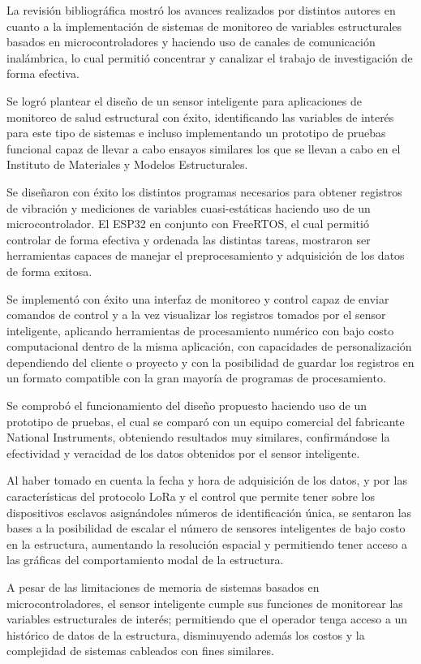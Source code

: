 	
	La revisión bibliográfica mostró los avances realizados por distintos autores en cuanto a la implementación de sistemas de monitoreo de variables estructurales basados en microcontroladores y haciendo uso de canales de comunicación inalámbrica, lo cual permitió concentrar y canalizar el trabajo de investigación de forma efectiva.
	
	Se logró plantear el diseño de un sensor inteligente para aplicaciones de monitoreo de salud estructural con éxito, identificando las variables de interés para este tipo de sistemas e incluso implementando un prototipo de pruebas funcional capaz de llevar a cabo ensayos similares los que se llevan a cabo en el Instituto de Materiales y Modelos Estructurales.
	
	Se diseñaron con éxito los distintos programas necesarios para obtener registros de vibración y mediciones de variables cuasi-estáticas haciendo uso de un microcontrolador. El ESP32 en conjunto con FreeRTOS, el cual permitió controlar de forma efectiva y ordenada las distintas tareas, mostraron ser herramientas capaces de manejar el preprocesamiento y adquisición de los datos de forma exitosa.
	
	Se implementó con éxito una interfaz de monitoreo y control capaz de enviar comandos de control y a la vez visualizar los registros tomados por el sensor inteligente, aplicando herramientas de procesamiento numérico con bajo costo computacional dentro de la misma aplicación, con capacidades de personalización dependiendo del cliente o proyecto y con la posibilidad de  guardar los registros en un formato compatible con la gran mayoría de programas de procesamiento.

	Se comprobó el funcionamiento del diseño propuesto haciendo uso de un prototipo de pruebas, el cual se comparó con un equipo comercial del fabricante National Instruments, obteniendo resultados muy similares, confirmándose la efectividad y veracidad de los datos obtenidos por el sensor inteligente.
	
	Al haber tomado en cuenta la fecha y hora de adquisición de los datos, y por las características del protocolo LoRa y el control que permite tener sobre los dispositivos esclavos asignándoles números de identificación única, se sentaron las bases a la posibilidad de escalar el número de sensores inteligentes de bajo costo en la estructura, aumentando la resolución espacial y permitiendo tener acceso a las gráficas del comportamiento modal de la estructura.
	
	A pesar de las limitaciones de memoria de sistemas basados en microcontroladores, el sensor inteligente cumple sus funciones de monitorear las variables estructurales de interés; permitiendo que el operador tenga acceso a un histórico de datos de la estructura, disminuyendo además los costos y la complejidad de sistemas cableados con fines similares.
	
